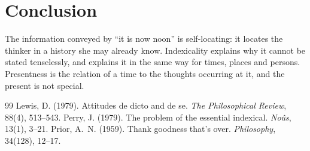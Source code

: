 \documentclass{situationist-preprint}
\begin{document}
\section{Conclusion}

The information conveyed by \enquote{it is now noon} is self-locating: it locates the thinker in a history she may already know. Indexicality explains why it cannot be stated tenselessly, and explains it in the same way for times, places and persons. Presentness is the relation of a time to the thoughts occurring at it, and the present is not special.

\begin{thebibliography}{99}\small
{} Lewis, D. (1979). Attitudes de dicto and de se. \emph{The Philosophical Review}, 88(4), 513--543.
 Perry, J. (1979). The problem of the essential indexical. \emph{No\^us}, 13(1), 3--21.
 Prior, A.~N. (1959). Thank goodness that's over. \emph{Philosophy}, 34(128), 12--17.
\end{thebibliography}
\end{document}
